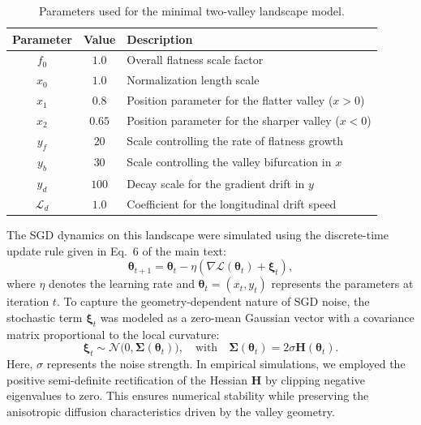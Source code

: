 \documentclass[aps,prx,preprint,superscriptaddress,nofootinbib]{revtex4-2}
\begin{document}
\begin{table}[h]
\centering
\caption{Parameters used for the minimal two-valley landscape model.}
\label{tab:parameters}
\renewcommand{\arraystretch}{1.2}
\begin{tabular}{ccl}
\hline
\textbf{Parameter} & \textbf{Value} & \textbf{Description} \\
\hline
$f_0$ & $1.0$ & Overall flatness scale factor \\
$x_0$ & $1.0$ & Normalization length scale \\
\hline
$x_1$ & $0.8$ & Position parameter for the flatter valley ($x > 0$) \\
$x_2$ & $0.65$ & Position parameter for the sharper valley ($x < 0$) \\
\hline
$y_f$ & $20$ & Scale controlling the rate of flatness growth \\
$y_b$ & $30$ & Scale controlling the valley bifurcation in $x$ \\
$y_d$ & $100$ & Decay scale for the gradient drift in $y$ \\
$\mathcal{L}_d$ & $1.0$ & Coefficient for the longitudinal drift speed \\
\hline
\end{tabular}
\end{table}

The SGD dynamics on this landscape were simulated using the discrete-time update rule given in Eq.~6 of the main text:
\begin{equation}
    \bm{\theta}_{t+1} = \bm{\theta}_t - \eta \left( \nabla \mathcal{L}(\bm{\theta}_t) + \bm{\xi}_t \right),
\end{equation}
where $\eta$ denotes the learning rate and $\bm{\theta}_t = (x_t, y_t)$ represents the parameters at iteration $t$. To capture the geometry-dependent nature of SGD noise, the stochastic term $\bm{\xi}_t$ was modeled as a zero-mean Gaussian vector with a covariance matrix proportional to the local curvature:
\begin{equation}
    \bm{\xi}_t \sim \mathcal{N}\bigl(0, \mathbf{\Sigma}(\bm{\theta}_t)\bigr), \quad \text{with} \quad \mathbf{\Sigma}(\bm{\theta}_t) = 2\sigma \mathbf{H}(\bm{\theta}_t).
\end{equation}
Here, $\sigma$ represents the noise strength. In empirical simulations, we employed the positive semi-definite rectification of the Hessian $\mathbf{H}$ by clipping negative eigenvalues to zero. This ensures numerical stability while preserving the anisotropic diffusion characteristics driven by the valley geometry.
\end{document}
